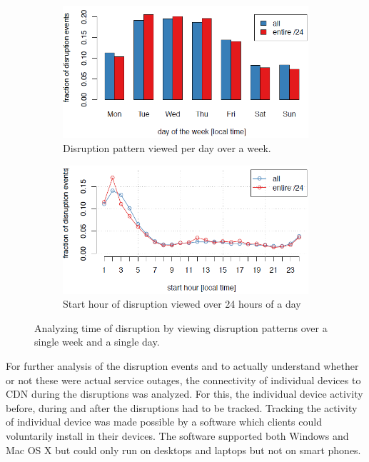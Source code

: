 \documentclass[11pt,twoside,a4paper]{article}
\begin{document}
\begin{figure}[h!]
  \centering
  \begin{subfigure}[b]{0.47\linewidth}
    \includegraphics[width=\linewidth]{5a.png}
    \caption{Disruption pattern viewed per day over a week.}
  \end{subfigure}
  \begin{subfigure}[b]{0.47\linewidth}
    \includegraphics[width=\linewidth]{5b.png}
    \caption{Start hour of disruption viewed over 24 hours of a day}
  \end{subfigure}
  \caption{Analyzing time of disruption by viewing disruption patterns over a single week and a single day.}
  \label{fig:Patterns}
\end{figure}

For further analysis of the disruption events and to actually understand whether or not these were actual service outages, the connectivity of individual devices to CDN during the disruptions was analyzed. For this, the individual device activity before, during and after the disruptions had to be tracked. Tracking the activity of individual device was made possible by a software which clients could voluntarily install in their devices. The software supported both Windows and Mac OS X but could only run on desktops and laptops but not on smart phones.  
\end{document}
